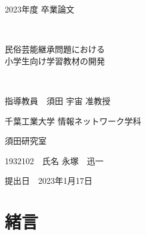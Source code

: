 \documentclass[12pt]{ltjsarticle}
\begin{document}
\begin{titlepage}
  \begin{center}
  
    \vspace*{20truept}
    
    {\LARGE 2023年度 卒業論文} 
    
    \vspace*{75truept}
    
    {\Huge }　%

    \vspace{10truept}

    {\Huge 民俗芸能継承問題における\\小学生向け学習教材の開発}　%

    \vspace{10truept}

    {\Huge }　%

    \vspace{85truept}
    
    {\LARGE 指導教員　須田 宇宙 准教授}
    
    \vspace{60truept}
    
    {\LARGE 千葉工業大学 情報ネットワーク学科}
    
    \vspace{15truept}
    
    {\LARGE 須田研究室}
    
    \vspace{70truept}
    
    {\LARGE 1932102　氏名 永塚　迅一 }　%

    \vspace{70truept}
    
  \end{center}
  \begin{flushright}

    {\LARGE 提出日　2023年1月17日}
  
  \end{flushright}
\end{titlepage}







\tableofcontents
\newpage
\section{緒言}
\end{document}
